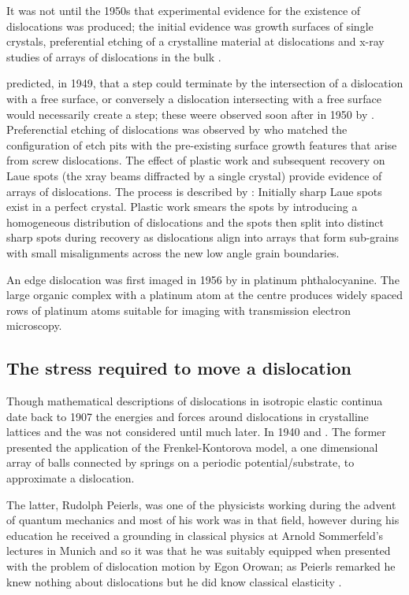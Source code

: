 It was not until the 1950s that experimental evidence for the existence of dislocations was produced; the initial evidence was growth surfaces of single crystals, preferential etching of a crystalline material at dislocations and x-ray studies of arrays of dislocations in the bulk \cite{Forty1954}. 

\citet{Frank1949} predicted, in 1949, that a step could terminate by the intersection of a dislocation with a free surface, or conversely a dislocation intersecting with a free surface would necessarily create a step; these weere observed soon after in 1950 by \citet{Griffin1950}. Preferenctial etching of dislocations was observed by \citet{horn1952holes} who matched the configuration of etch pits with the pre-existing surface growth features that arise from screw dislocations. The effect of plastic work and subsequent recovery on Laue spots (the xray beams diffracted by a single crystal) provide evidence of arrays of dislocations. The process is described by \citet{Cottrell1949}: Initially sharp Laue spots exist in a perfect crystal. Plastic work smears the spots by introducing a homogeneous distribution of dislocations and the spots then split into distinct sharp spots during recovery as dislocations align into arrays that form sub-grains with small misalignments across the new low angle grain boundaries.


An edge dislocation was first imaged in 1956 by \citet{Menter1956} in platinum phthalocyanine. The large organic complex with a platinum atom at the centre produces widely spaced rows of platinum atoms suitable for imaging with transmission electron microscopy.




\subsection{The stress required to move a dislocation}

Though mathematical descriptions of dislocations in isotropic elastic continua date back to 1907 \cite{Volterra1907} the energies and forces around dislocations in crystalline lattices and the  was not considered until much later. In 1940 \citet{Dehlinger1940} and \citet{Peierls1940}. The former presented the application of the Frenkel-Kontorova model, a one dimensional array of balls connected by springs on a periodic potential/substrate, to approximate a dislocation.

The latter, Rudolph Peierls, was one of the physicists working during the advent of quantum mechanics and most of his work was in that field, however during his education he received a grounding in classical physics at Arnold Sommerfeld's lectures in Munich and so it was that he was suitably equipped when presented with the problem of dislocation motion by Egon Orowan; as Peierls remarked he knew nothing about dislocations but he did know classical elasticity \cite{Edwards1996}.


